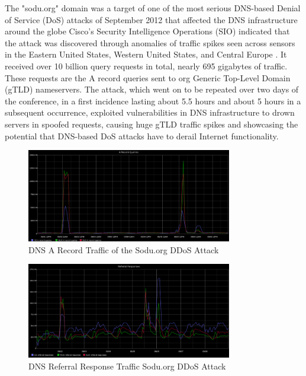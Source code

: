 \begin{enumerate}
The "sodu.org" domain was a target of one of the most serious DNS-based Denial of Service (DoS) attacks of September 2012 that affected the DNS infrastructure around the globe Cisco's Security Intelligence Operations (SIO) indicated that the attack was discovered through anomalies of traffic spikes seen across sensors in the Eastern United States, Western United States, and Central Europe \cite{ Middleton2024}. It received over 10 billion query requests in total, nearly 695 gigabytes of traffic. These requests are the A record queries sent to org Generic Top-Level Domain (gTLD) nameservers. The attack, which went on to be repeated over two days of the conference, in a first incidence lasting about 5.5 hours and about 5 hours in a subsequent occurrence, exploited vulnerabilities in DNS infrastructure to drown servers in spoofed requests, causing huge gTLD traffic spikes and showcasing the potential that DNS-based DoS attacks have to derail Internet functionality.

\captionsetup{font= footnotesize}
\begin{figure}[ht!]
    \centering
    \includegraphics[width=0.8\textwidth]{background/DNSTRaffic.png}
    \caption{DNS A Record Traffic of the Sodu.org DDoS Attack }
    \label{fig:figureSeven}
\end{figure}

\captionsetup{font= footnotesize}
\begin{figure}[ht!]
    \centering
    \includegraphics[width=0.8\textwidth]{background/DNSRef.png}
    \caption{ DNS Referral Response Traffic Sodu.org DDoS Attack}
    \label{fig:FigureEight}
\end{figure}


\end{enumerate}
